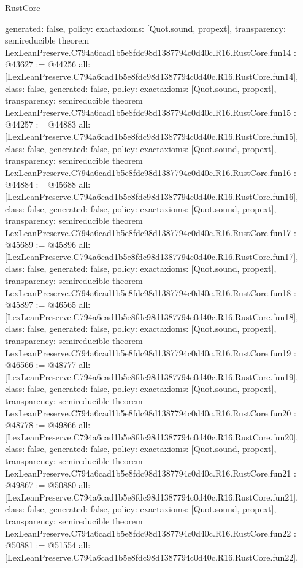 \begin{lexlean}{RustCore}
\begin{coremodule}
{  generated: false,
  policy: exact{axioms: [Quot.sound, propext]},
  transparency: semireducible
}
theorem LexLeanPreserve.C794a6cad1b5e8fdc98d1387794c0d40c.R16.RustCore.fun14 : @43627 := @44256 {
  all: [LexLeanPreserve.C794a6cad1b5e8fdc98d1387794c0d40c.R16.RustCore.fun14],
  class: false,
  generated: false,
  policy: exact{axioms: [Quot.sound, propext]},
  transparency: semireducible
}
theorem LexLeanPreserve.C794a6cad1b5e8fdc98d1387794c0d40c.R16.RustCore.fun15 : @44257 := @44883 {
  all: [LexLeanPreserve.C794a6cad1b5e8fdc98d1387794c0d40c.R16.RustCore.fun15],
  class: false,
  generated: false,
  policy: exact{axioms: [Quot.sound, propext]},
  transparency: semireducible
}
theorem LexLeanPreserve.C794a6cad1b5e8fdc98d1387794c0d40c.R16.RustCore.fun16 : @44884 := @45688 {
  all: [LexLeanPreserve.C794a6cad1b5e8fdc98d1387794c0d40c.R16.RustCore.fun16],
  class: false,
  generated: false,
  policy: exact{axioms: [Quot.sound, propext]},
  transparency: semireducible
}
theorem LexLeanPreserve.C794a6cad1b5e8fdc98d1387794c0d40c.R16.RustCore.fun17 : @45689 := @45896 {
  all: [LexLeanPreserve.C794a6cad1b5e8fdc98d1387794c0d40c.R16.RustCore.fun17],
  class: false,
  generated: false,
  policy: exact{axioms: [Quot.sound, propext]},
  transparency: semireducible
}
theorem LexLeanPreserve.C794a6cad1b5e8fdc98d1387794c0d40c.R16.RustCore.fun18 : @45897 := @46565 {
  all: [LexLeanPreserve.C794a6cad1b5e8fdc98d1387794c0d40c.R16.RustCore.fun18],
  class: false,
  generated: false,
  policy: exact{axioms: [Quot.sound, propext]},
  transparency: semireducible
}
theorem LexLeanPreserve.C794a6cad1b5e8fdc98d1387794c0d40c.R16.RustCore.fun19 : @46566 := @48777 {
  all: [LexLeanPreserve.C794a6cad1b5e8fdc98d1387794c0d40c.R16.RustCore.fun19],
  class: false,
  generated: false,
  policy: exact{axioms: [Quot.sound, propext]},
  transparency: semireducible
}
theorem LexLeanPreserve.C794a6cad1b5e8fdc98d1387794c0d40c.R16.RustCore.fun20 : @48778 := @49866 {
  all: [LexLeanPreserve.C794a6cad1b5e8fdc98d1387794c0d40c.R16.RustCore.fun20],
  class: false,
  generated: false,
  policy: exact{axioms: [Quot.sound, propext]},
  transparency: semireducible
}
theorem LexLeanPreserve.C794a6cad1b5e8fdc98d1387794c0d40c.R16.RustCore.fun21 : @49867 := @50880 {
  all: [LexLeanPreserve.C794a6cad1b5e8fdc98d1387794c0d40c.R16.RustCore.fun21],
  class: false,
  generated: false,
  policy: exact{axioms: [Quot.sound, propext]},
  transparency: semireducible
}
theorem LexLeanPreserve.C794a6cad1b5e8fdc98d1387794c0d40c.R16.RustCore.fun22 : @50881 := @51554 {
  all: [LexLeanPreserve.C794a6cad1b5e8fdc98d1387794c0d40c.R16.RustCore.fun22],
}
\end{coremodule}
\end{lexlean}
